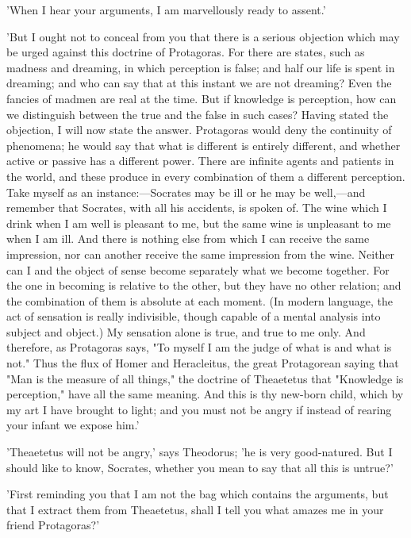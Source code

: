 \documentclass[11pt,letter]{article}
\begin{document}
\par  'When I hear your arguments, I am marvellously ready to assent.'

\par  'But I ought not to conceal from you that there is a serious objection which may be urged against this doctrine of Protagoras. For there are states, such as madness and dreaming, in which perception is false; and half our life is spent in dreaming; and who can say that at this instant we are not dreaming? Even the fancies of madmen are real at the time. But if knowledge is perception, how can we distinguish between the true and the false in such cases? Having stated the objection, I will now state the answer. Protagoras would deny the continuity of phenomena; he would say that what is different is entirely different, and whether active or passive has a different power. There are infinite agents and patients in the world, and these produce in every combination of them a different perception. Take myself as an instance:—Socrates may be ill or he may be well,—and remember that Socrates, with all his accidents, is spoken of. The wine which I drink when I am well is pleasant to me, but the same wine is unpleasant to me when I am ill. And there is nothing else from which I can receive the same impression, nor can another receive the same impression from the wine. Neither can I and the object of sense become separately what we become together. For the one in becoming is relative to the other, but they have no other relation; and the combination of them is absolute at each moment. (In modern language, the act of sensation is really indivisible, though capable of a mental analysis into subject and object.) My sensation alone is true, and true to me only. And therefore, as Protagoras says, "To myself I am the judge of what is and what is not." Thus the flux of Homer and Heracleitus, the great Protagorean saying that "Man is the measure of all things," the doctrine of Theaetetus that "Knowledge is perception," have all the same meaning. And this is thy new-born child, which by my art I have brought to light; and you must not be angry if instead of rearing your infant we expose him.'

\par  'Theaetetus will not be angry,' says Theodorus; 'he is very good-natured. But I should like to know, Socrates, whether you mean to say that all this is untrue?'

\par  'First reminding you that I am not the bag which contains the arguments, but that I extract them from Theaetetus, shall I tell you what amazes me in your friend Protagoras?'
\end{document}
